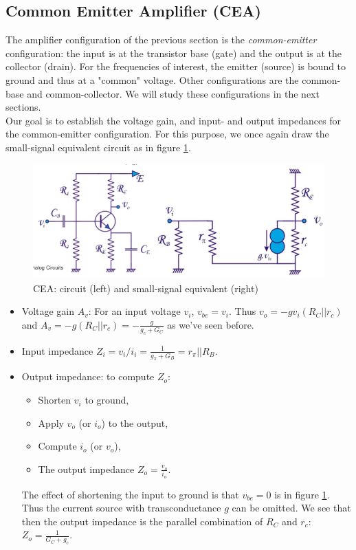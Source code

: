 \subsection{Common Emitter Amplifier (CEA)}
\label{sec:cea}
The amplifier configuration of the previous section is the \emph{common-emitter} configuration: the input is at the transistor base (gate) and the output is at the collector (drain). For the frequencies of interest, the emitter (source) is bound to ground and thus at a "common" voltage. Other configurations are the common-base and common-collector. We will study these configurations in the next sections.\\
Our goal is to establish the voltage gain, and input- and output impedances for the common-emitter configuration. For this purpose, we once again draw the small-signal equivalent circuit as in figure \ref{fig:amplifier7}.
\begin{figure}[h!]
	\centering
	\includegraphics[width=14cm]{figures/ch02/amplifier7.jpg}
	\caption{CEA: circuit (left) and small-signal equivalent (right)}
	\label{fig:amplifier7}
\end{figure}
\begin{itemize}
	\item Voltage gain $A_v$: For an input voltage $v_i$, $v_{be} = v_i$. Thus $v_o = -g v_i (R_C || r_c)$ and $A_v = -g (R_C || r_c) = -\frac{g}{g_c + G_C}$ as we've seen before.
	\item Input impedance $Z_i = v_i/i_i = \frac{1}{g_{\pi} + G_B} = r_{\pi} || R_B$.
	\item Output impedance: to compute $Z_o$:
	\begin{itemize}
		\item Shorten $v_i$ to ground,
		\item Apply $v_o$ (or $i_o$) to the output,
		\item Compute $i_o$ (or $v_o$),
		\item The output impedance $Z_o = \frac{v_o}{i_o}$.
	\end{itemize}
	The effect of shortening the input to ground is that $v_{be} = 0$ is in figure \ref{fig:amplifier7}. Thus the current source with transconductance $g$ can be omitted. We see that then the output impedance is the parallel combination of $R_C$ and $r_c$: $Z_o = \frac{1}{G_C + g_c}$.
\end{itemize}


